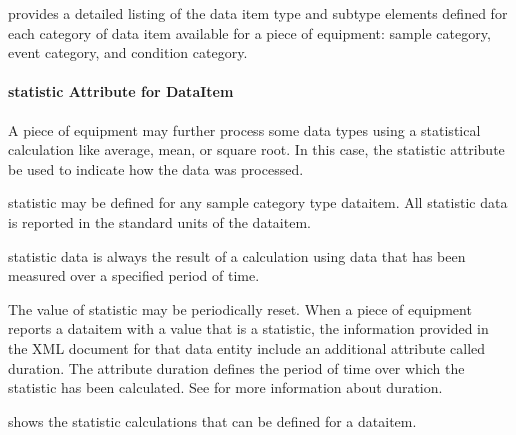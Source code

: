 \documentclass{mtconnect}	%
\begin{document}
 provides a detailed listing of the data item \gls{type} and \gls{subtype} elements defined for each \gls{category} of data item available for a piece of equipment: \gls{sample category}, \gls{event category}, and \gls{condition category}.

\paragraph{statistic Attribute for DataItem}\mbox{}

A piece of equipment may further process some data types using a statistical calculation like average, mean, or square root.  In this case, the \gls{statistic} attribute \may be used to indicate how the data was processed.  

\gls{statistic} may be defined for any \gls{sample category} type \gls{dataitem}.   All statistic data is reported in the standard units of the \gls{dataitem}.

\gls{statistic} data is always the result of a calculation using data that has been measured over a specified period of time. 

The value of \gls{statistic} may be periodically reset.   When a piece of equipment reports a \gls{dataitem} with a value that is a \gls{statistic}, the information provided in the XML document for that \gls{data entity} \must include an additional attribute called \gls{duration}.   The attribute \gls{duration} defines the period of time over which the \gls{statistic} has been calculated.   See  for more information about \gls{duration}.

 shows the \gls{statistic} calculations that can be defined for a \gls{dataitem}.
\end{document}
